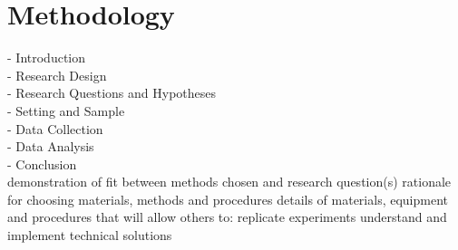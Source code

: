 
\chapter{Methodology}
\label{ch:methodology}

- Introduction\\
- Research Design\\
- Research Questions and Hypotheses\\
- Setting and Sample\\
- Data Collection\\
- Data Analysis\\
- Conclusion\\


demonstration of fit between methods chosen and research question(s)
rationale for choosing materials, methods and procedures
details of materials, equipment and procedures that will allow others to:
replicate experiments
understand and implement technical solutions













